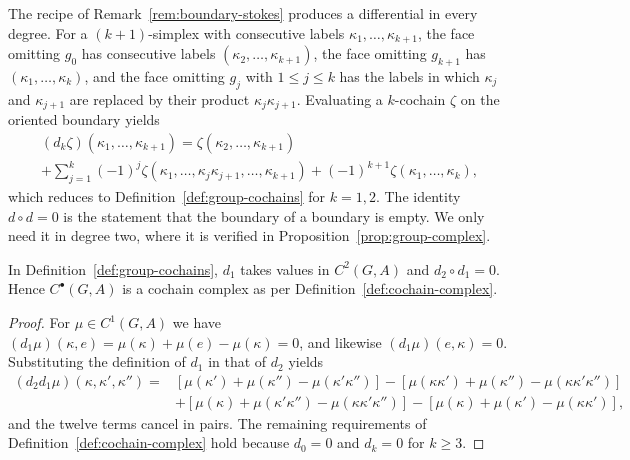 \begin{remark}\label{rem:group-general}
	The recipe of Remark~\ref{rem:boundary-stokes} produces a differential in every degree. For a $(k+1)$-simplex with consecutive labels $\kappa_1,\dots,\kappa_{k+1}$, the face omitting $g_0$ has consecutive labels $(\kappa_2,\dots,\kappa_{k+1})$, the face omitting $g_{k+1}$ has $(\kappa_1,\dots,\kappa_k)$, and the face omitting $g_j$ with $1\leq j\leq k$ has the labels in which $\kappa_j$ and $\kappa_{j+1}$ are replaced by their product $\kappa_j\kappa_{j+1}$. Evaluating a $k$-cochain $\zeta$ on the oriented boundary yields
	\begin{multline*}
		(d_k\zeta)(\kappa_1,\dots,\kappa_{k+1})=\zeta(\kappa_2,\dots,\kappa_{k+1})\\
		+\sum_{j=1}^k(-1)^j\zeta(\kappa_1,\dots,\kappa_j\kappa_{j+1},\dots,\kappa_{k+1})+(-1)^{k+1}\zeta(\kappa_1,\dots,\kappa_k),
	\end{multline*}
	which reduces to Definition~\ref{def:group-cochains} for $k=1,2$. The identity $d\circ d=0$ is the statement that the boundary of a boundary is empty. We only need it in degree two, where it is verified in Proposition~\ref{prop:group-complex}.
\end{remark}

\begin{proposition}\label{prop:group-complex}
	In Definition~\ref{def:group-cochains}, $d_1$ takes values in $C^2(G,A)$ and $d_2\circ d_1=0$. Hence $C^\bullet(G,A)$ is a cochain complex as per Definition~\ref{def:cochain-complex}.
\end{proposition}

\begin{proof}
	For $\mu\in C^1(G,A)$ we have $(d_1\mu)(\kappa,e)=\mu(\kappa)+\mu(e)-\mu(\kappa)=0$, and likewise $(d_1\mu)(e,\kappa)=0$. Substituting the definition of $d_1$ in that of $d_2$ yields
	\begin{align*}
		(d_2d_1\mu)(\kappa,\kappa',\kappa'')={}&[\mu(\kappa')+\mu(\kappa'')-\mu(\kappa'\kappa'')]-[\mu(\kappa\kappa')+\mu(\kappa'')-\mu(\kappa\kappa'\kappa'')]\\
		&+[\mu(\kappa)+\mu(\kappa'\kappa'')-\mu(\kappa\kappa'\kappa'')]-[\mu(\kappa)+\mu(\kappa')-\mu(\kappa\kappa')],
	\end{align*}
	and the twelve terms cancel in pairs. The remaining requirements of Definition~\ref{def:cochain-complex} hold because $d_0=0$ and $d_k=0$ for $k\geq3$.
\end{proof}

